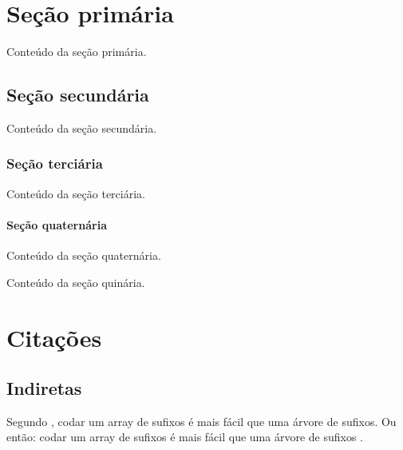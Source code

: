 \documentclass[serif, brazilian]{uffstex}
\begin{document}

\pretextual

\imprimircapa

\imprimirfolhaderosto

\tableofcontents*
\cleardoublepage

\textual

\chapter{Seção primária}

Conteúdo da seção primária.

\section{Seção secundária}

Conteúdo da seção secundária.

\subsection{Seção terciária}

Conteúdo da seção terciária.

\subsubsection{Seção quaternária}

Conteúdo da seção quaternária.


Conteúdo da seção quinária.

\chapter{Citações}

\section{Indiretas}

Segundo \textcite{halim3rd}, codar um array de sufixos é mais fácil que uma árvore de sufixos. Ou então: codar um array de sufixos é mais fácil que uma árvore de sufixos \cite[253]{halim3rd}.
\end{document}
